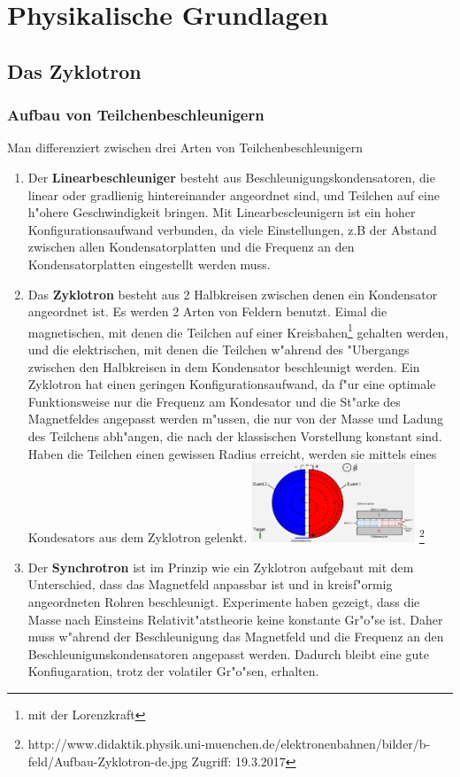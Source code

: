 \documentclass[14pt, a4paper]{report}
\begin{document}
\part{Physikalische Grundlagen}
\chapter{Das Zyklotron}
\section{Aufbau von Teilchenbeschleunigern}
Man differenziert zwischen drei Arten von Teilchenbeschleunigern \footnotemark
{}
\begin{enumerate}
\item
Der \textbf{Linearbeschleuniger} besteht aus Beschleunigungskondensatoren, die linear
oder gradlienig hintereinander angeordnet sind, und Teilchen auf 
eine h"ohere Geschwindigkeit bringen. Mit Linearbescleunigern ist ein hoher
Konfigurationsaufwand verbunden, da viele Einstellungen, z.B der Abstand zwischen allen
Kondensatorplatten und die Frequenz an den Kondensatorplatten eingestellt werden muss.
\item \label{ZyklotronBeschreibungAufbau}
Das \textbf{Zyklotron} besteht aus 2 Halbkreisen zwischen denen ein Kondensator 
angeordnet ist. Es werden 2 Arten von Feldern benutzt. Eimal die magnetischen, mit 
denen die 
Teilchen auf einer Kreisbahen\footnote{mit der Lorenzkraft}
gehalten werden, und die elektrischen, 
mit denen die Teilchen w"ahrend des "Ubergangs zwischen den Halbkreisen in dem 
Kondensator beschleunigt werden. Ein Zyklotron hat einen geringen 
Konfigurationsaufwand, da f"ur eine optimale Funktionsweise nur die Frequenz am 
Kondesator und die St"arke des Magnetfeldes angepasst werden m"ussen, die nur von der 
Masse und Ladung des Teilchens abh"angen, die nach der klassischen Vorstellung konstant
sind. Haben die Teilchen einen gewissen Radius erreicht, werden sie mittels eines 
Kondesators aus dem Zyklotron gelenkt.
\includegraphics[height=90px]{doc/Aufbau-Zyklotron-de.jpg}
\footnote{http://www.didaktik.physik.uni-muenchen.de/elektronenbahnen/bilder/b-feld/Aufbau-Zyklotron-de.jpg Zugriff: 19.3.2017}

\item
Der \textbf{Synchrotron} ist im Prinzip wie ein Zyklotron aufgebaut mit dem 
Unterschied, dass das Magnetfeld anpassbar ist und in kreisf"ormig angeordneten Rohren 
beschleunigt. Experimente haben gezeigt, dass die
Masse nach Einsteins Relativit"atstheorie keine konstante Gr"o"se ist. Daher muss 
w"ahrend der Beschleunigung das Magnetfeld und die Frequenz an den 
Beschleunigunskondensatoren angepasst werden. Dadurch bleibt eine gute Konfiugaration, 
trotz der volatiler Gr"o"sen, erhalten. \label{synchrotron}
\end{enumerate}
\end{document}
